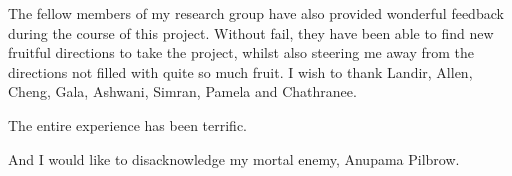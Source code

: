 The fellow members of my research group have also provided
wonderful feedback during the course of this project.
Without fail, they have been able to find new fruitful directions to take the project,
whilst also steering me away from the directions not filled with quite so much fruit.
I wish to thank Landir, Allen, Cheng, Gala, Ashwani, Simran, Pamela and Chathranee.

The entire experience has been terrific.

And I would like to disacknowledge my mortal enemy, Anupama Pilbrow.